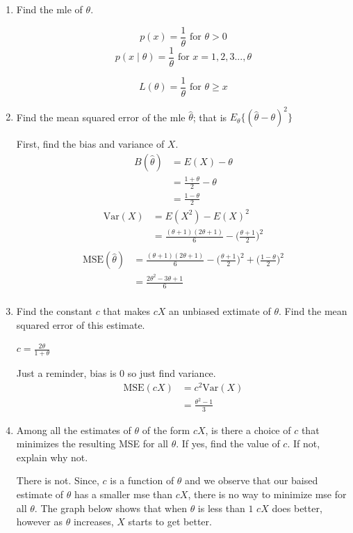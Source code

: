 \documentclass{tufte-book}
\newcommand{\Var}{\mathrm{Var}}
\newcommand{\MSE}{\mathrm{MSE}}
\theoremstyle{mytheoremstyle}
\theoremstyle{mylemstyle}
\theoremstyle{mydefstyle}
\begin{document}
\begin{enumerate}

\item Find the mle of $\theta$.

\[ p(x) = \frac{1}{\theta} \text{ for }{ \theta > 0} \]
\[ p(x \mid \theta) = \frac{1}{\theta} \text{ for } x=1,2,3...,\theta \]

\[ L(\theta) = \frac{1}{\theta} \text{ for }\theta \geq x \]

\item Find the mean squared error of the mle $\hat{\theta}$; that is $E_\theta\{(\hat{\theta} - \theta)^2\}$

First, find the bias and variance of $X$.
\begin{align*}
B(\hat{\theta}) &= E(X) - \theta\\
&= \frac{1+\theta}{2} - \theta\\
&= \frac{1-\theta}{2}
\end{align*}
\begin{align*}
\Var(X) &= E(X^2) - E(X)^2\\
&= \frac{(\theta+1)(2\theta+1)}{6} - \Big(\frac{\theta + 1}{2}\Big)^2\\
\end{align*}
\begin{align*}
\MSE(\hat{\theta}) &= \frac{(\theta+1)(2\theta+1)}{6} - \Big(\frac{\theta + 1}{2}\Big)^2 + \Big(\frac{1-\theta}{2}\Big)^2\\
&= \frac{2\theta^2 - 3\theta +1}{6}\\
\end{align*}

\item Find the constant $c$ that makes $cX$ an unbiased extimate of $\theta$.  Find the mean squared error of this estimate.

$c = \frac{2 \theta}{1 + \theta}$

Just a reminder, bias is $0$ so just find variance.
\begin{align*}
\MSE(cX) &= c^2\Var(X)\\
&=  \frac{\theta^2 -1}{3}
\end{align*}

\item Among all the estimates of $\theta$ of the form $cX$, is there a choice of $c$ that minimizes the resulting MSE for all $\theta$.  If yes, find the value of $c$. If not, explain why not.

There is not.  Since, $c$ is a function of $\theta$ and we observe that our baised estimate of $\theta$ has a smaller mse than $cX$,  there is no way to minimize mse for all $\theta$.  The graph below shows that when $\theta$ is less than $1$ $cX$ does better, however as $\theta$ increases, $X$ starts to get better.


\end{enumerate}
\end{document}
